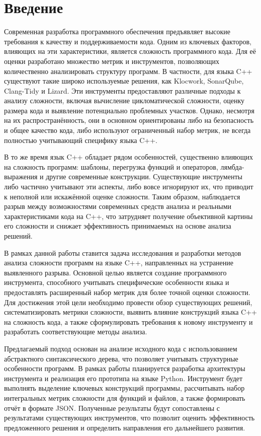 \documentclass[12pt,a4paper]{article}
\begin{document}
\section*{Введение}

Современная разработка программного обеспечения предъявляет высокие требования к качеству и поддерживаемости кода. Одним из ключевых факторов, влияющих на эти характеристики, является сложность программного кода. Для её оценки разработано множество метрик и инструментов, позволяющих количественно анализировать структуру программ. В частности, для языка C++ существуют такие широко используемые решения, как Klocwork, SonarQube, Clang-Tidy и Lizard. Эти инструменты предоставляют различные подходы к анализу сложности, включая вычисление цикломатической сложности, оценку размера кода и выявление потенциально проблемных участков. Однако, несмотря на их распространённость, они в основном ориентированы либо на безопасность и общее качество кода, либо используют ограниченный набор метрик, не всегда полностью учитывающий специфику языка C++.

В то же время язык C++ обладает рядом особенностей, существенно влияющих на сложность программ: шаблоны, перегрузка функций и операторов, лямбда-выражения и другие современные конструкции. Существующие инструменты либо частично учитывают эти аспекты, либо вовсе игнорируют их, что приводит к неполной или искажённой оценке сложности. Таким образом, наблюдается разрыв между возможностями современных средств анализа и реальными характеристиками кода на C++, что затрудняет получение объективной картины его сложности и снижает эффективность принимаемых на основе анализа решений.

В рамках данной работы ставится задача исследования и разработки методов анализа сложности программ на языке C++, направленных на устранение выявленного разрыва. Основной целью является создание программного инструмента, способного учитывать специфические особенности языка и предоставлять расширенный набор метрик для более точной оценки сложности. Для достижения этой цели необходимо провести обзор существующих решений, систематизировать метрики сложности, выявить влияние конструкций языка C++ на сложность кода, а также сформулировать требования к новому инструменту и разработать соответствующие методы анализа.

Предлагаемый подход основан на анализе исходного кода с использованием абстрактного синтаксического дерева, что позволяет учитывать структурные особенности программ. В рамках работы планируется разработка архитектуры инструмента и реализация его прототипа на языке Python. Инструмент будет выполнять выделение ключевых конструкций программы, рассчитывать набор интегральных метрик сложности для функций и файлов, а также формировать отчёт в формате JSON. Полученные результаты будут сопоставлены с результатами существующих инструментов, что позволит оценить эффективность предложенного решения и определить направления его дальнейшего развития.
\end{document}
